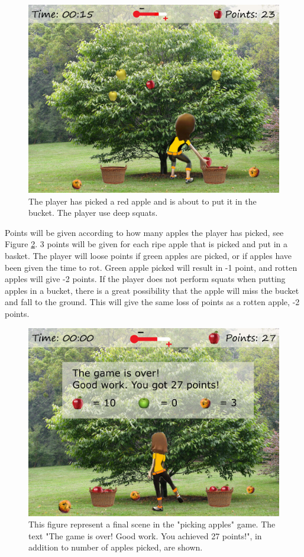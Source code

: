 \begin{figure} [H]
\centering
\includegraphics[scale=0.1]{squatppletreeEng.jpg}
\caption[Picking apples - squats]{The player has picked a red apple and is about to put it in the bucket. The player use deep squats.}
\label{fig:appleSquat}
\end{figure}

Points will be given according to how many apples the player has picked, see Figure \ref{fig:appleOver}. 3 points will be given for each ripe apple that is picked and put in a basket. The player will loose points if green apples are picked, or if apples have been given the time to rot. Green apple picked will result in -1 point, and rotten apples will give -2 points. If the player does not perform squats when putting apples in a bucket, there is a great possibility that the apple will miss the bucket and fall to the ground. This will give the same loss of points as a rotten apple, -2 points.       

\begin{figure} [H]
\centering
\includegraphics[scale=0.1]{appletreeendEng.jpg}
\caption[Picking apples - points]{This figure represent a final scene in the "picking apples" game. The text "The game is over! Good work. You achieved 27 points!", in addition to number of apples picked, are shown.}
\label{fig:appleOver}
\end{figure}

